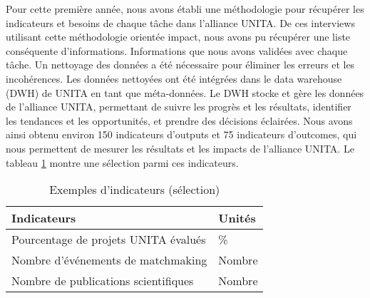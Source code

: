 Pour cette première année, nous avons établi une méthodologie pour récupérer les indicateurs et besoins de chaque tâche dans l'alliance UNITA. De ces interviews utilisant cette méthodologie orientée impact, nous avons pu récupérer une liste conséquente d'informations. Informations que nous avons validées avec chaque tâche.
Un nettoyage des données a été nécessaire pour éliminer les erreurs et les incohérences. Les données nettoyées ont été intégrées dans le data warehouse (DWH) de UNITA en tant que méta-données. Le DWH stocke et gère les données de l'alliance UNITA, permettant de suivre les progrès et les résultats, identifier les tendances et les opportunités, et prendre des décisions éclairées.
Nous avons ainsi obtenu environ 150 indicateurs d'outputs et 75 indicateurs d'outcomes, qui nous permettent de mesurer les résultats et les impacts de l'alliance UNITA. Le tableau \ref{tab:indic_ex} montre une sélection parmi ces indicateurs.
\vspace{-12px}
\begin{table}[h] \caption{Exemples d'indicateurs (sélection)} \begin{center} \begin{tabular}{|l|l|} \hline \textbf{Indicateurs} & \textbf{Unités} \\ \hline Pourcentage de projets UNITA évalués & \% \\ \hline Nombre d'événements de matchmaking & Nombre \\ \hline Nombre de publications scientifiques & Nombre \\ \hline \end{tabular} \label{tab:indic_ex} \end{center} \end{table}

\vspace{-26px}